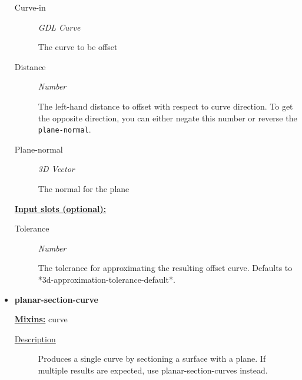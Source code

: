 \documentclass [11pt]{book}
\begin{document}
\begin{itemize}
\begin{description}

\item [Curve-in]
\emph{GDL Curve}

 The curve to be offset




\item [Distance]
\emph{Number}

 The left-hand distance to offset with respect to curve direction. To get the opposite
direction, you can either negate this number or reverse the \texttt{plane-normal}.




\item [Plane-normal]
\emph{3D Vector}

 The normal for the plane




\end{description}






\textbf{
\underline{Input slots (optional):}}

\begin{description}

\item [Tolerance]
\emph{Number}

 The tolerance for approximating the resulting offset curve.
Defaults to *3d-approximation-tolerance-default*.




\end{description}







\item {}
\label{prim:planar-section-curve}
\textbf{planar-section-curve}


\textbf{
\underline{Mixins:}} curve





\begin{description}

\item [
\underline{Description}]


Produces a single curve by sectioning a surface with a plane. If multiple results are expected,
use planar-section-curves instead.




\end{description}
\end{itemize}
\end{document}
